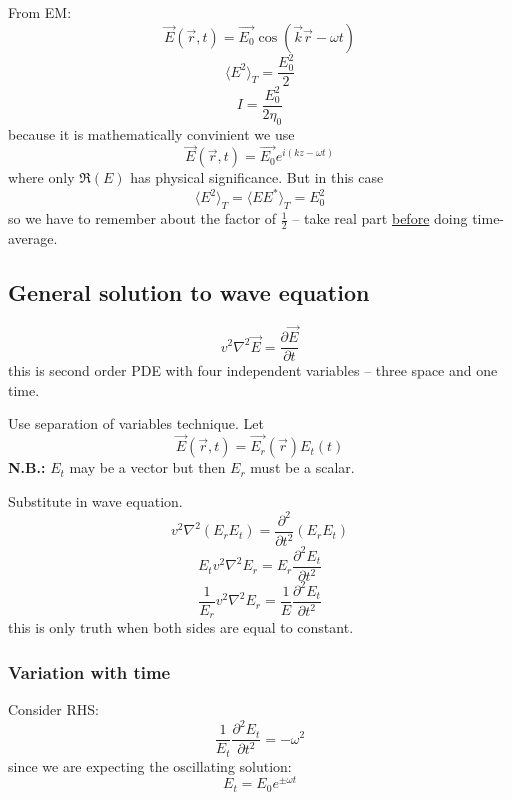 \documentclass[10pt]{article}
\begin{document}
From EM:
\begin{equation*}
\vec{E}(\vec{r},t) = \vec{E_0}\cos(\vec{k}\vec{r} - \omega t)
\end{equation*}
\begin{equation*}
\langle E^2 \rangle_T = \frac{E_0 ^2}{2}
\end{equation*}
\begin{equation}
\boxed{I = \frac{E_0 ^2}{2 \eta_0}}
\end{equation}
because it is mathematically convinient we use
\begin{equation*}
\vec{E}(\vec{r},t) = \vec{E_0} e^{i(kz - \omega t)}
\end{equation*}
where only $\Re{(E)}$ has physical significance. But in this case
\begin{equation*}
\langle E^2 \rangle_T = \langle EE^{*} \rangle_T = E_0 ^2
\end{equation*}
so we have to remember about the factor of $\frac{1}{2}$ -- take real part \underline{before} doing time-average.

\subsection{General solution to wave equation}
\begin{equation*}
v^2 \nabla^2 \vec{E} = \frac{\partial \vec{E}}{\partial t}
\end{equation*}
this is second order PDE with four independent variables -- three space and one time.

Use separation of variables technique.
Let
\begin{equation*}
\vec{E}(\vec{r},t) = \vec{E_r}(\vec{r})E_t(t)
\end{equation*}
\textbf{N.B.:} $E_t$ may be a vector but then $E_r$ must be a scalar.

Substitute in wave equation.
\begin{equation*}
v^2 \nabla^2(E_r E_t) = \frac{\partial^2}{\partial t^2}(E_r E_t)
\end{equation*}
\begin{equation*}
E_t v^2 \nabla^2 E_r = E_r \frac{\partial^2 E_t}{\partial t^2}
\end{equation*}
\begin{equation}
\boxed{\frac{1}{E_r}v^2 \nabla^2 E_r = \frac{1}{E} \frac{\partial^2 E_t}{\partial t^2}}
\end{equation}
this is only truth when both sides are equal to constant.

\subsubsection{Variation with time}
Consider RHS:
\begin{equation*}
\frac{1}{E_t} \frac{\partial^2 E_t}{\partial t^2} = -\omega^2
\end{equation*}
since we are expecting the oscillating solution:
\begin{equation}
\boxed{E_t = E_0 e^{\pm \omega t}}
\end{equation}
\end{document}
